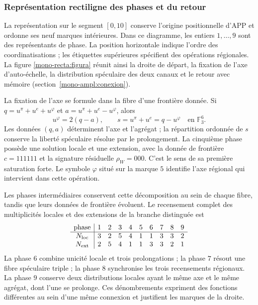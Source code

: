 \subsubsection{Représentation rectiligne des phases et du retour}
\label{mono-recta:desarrollo}

La représentation sur le segment \([0,10]\) conserve l'origine positionnelle d'APP et ordonne ses neuf marques intérieures. Dans ce diagramme, les entiers \(1,\ldots,9\) sont des représentants de phase. La position horizontale indique l'ordre des coordinatisations ; les étiquettes supérieures spécifient des opérations régionales. La figure \ref{mono-recta:figura} réunit ainsi la droite de départ, la fixation de l'axe d'auto-échelle, la distribution spéculaire des deux canaux et le retour avec mémoire (section~\ref{mono-ampl:conexion}).



La fixation de l'axe se formule dans la fibre d'une frontière donnée. Si
\(q=u^\pi+u^e+u^\varphi\) et
\(a=u^\pi+u^e-u^\varphi\), alors
\[
 u^\varphi=2(q-a),\qquad s=u^\pi+u^e=q-u^\varphi
 \quad\text{en }\mathbb F_3^6.
\]
Les données \((q,a)\) déterminent l'axe et l'agrégat ; la répartition ordonnée de \(s\) conserve la liberté spéculaire résolue par le prolongement. La cinquième phase possède une solution locale et une extension, avec la donnée de frontière \(c=111111\) et la signature résiduelle \(\rho_W=000\). C'est le sens de sa première saturation forte. Le symbole \(\varphi\) situé sur la marque \(5\) identifie l'axe régional qui intervient dans cette opération.

Les phases intermédiaires conservent cette décomposition au sein de chaque fibre,
tandis que leurs données de frontière évoluent. Le recensement complet des
multiplicités locales et des extensions de la branche distinguée est
\[
\begin{array}{c|rrrrrrrrr}
\text{phase}&1&2&3&4&5&6&7&8&9\\\hline
N_{\rm loc}&3&2&5&4&1&1&3&3&2\\
N_{\rm ext}&2&5&4&1&1&3&3&2&1
\end{array}
\]
La phase \(6\) combine unicité locale et trois prolongations ; la phase
\(7\) résout une fibre spéculaire triple ; la phase \(8\) synchronise
les trois recensements régionaux. La phase \(9\) conserve deux distributions
locales ayant le même axe et le même agrégat, dont l'une se
prolonge. Ces dénombrements expriment des fonctions différentes au sein d'une
même connexion et justifient les marques de la droite.


